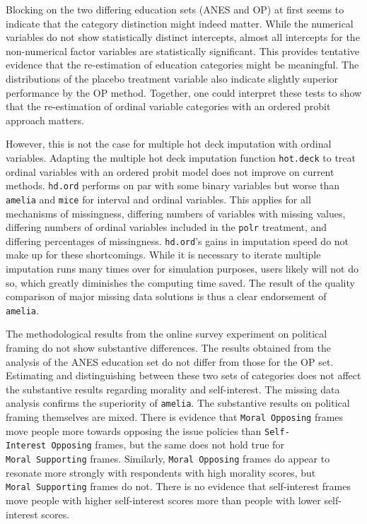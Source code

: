 \documentclass[12pt,econ]{sources/authesis}
\begin{document}
Blocking on the two differing education sets (ANES and OP) at first seems to indicate that the category distinction might indeed matter. While the numerical variables do not show statistically distinct intercepts, almost all intercepts for the non-numerical factor variables are statistically significant. This provides tentative evidence that the re-estimation of education categories might be meaningful. The distributions of the placebo treatment variable also indicate slightly superior performance by the OP method. Together, one could interpret these tests to show that the re-estimation of ordinal variable categories with an ordered probit approach matters.

However, this is not the case for multiple hot deck imputation with ordinal variables. Adapting the multiple hot deck imputation function \texttt{hot.deck} to treat ordinal variables with an ordered probit model does not improve on current methods. \texttt{hd.ord} performs on par with some binary variables but worse than \texttt{amelia} and \texttt{mice} for interval and ordinal variables. This applies for all mechanisms of missingness, differing numbers of variables with missing values, differing numbers of ordinal variables included in the \texttt{polr} treatment, and differing percentages of missingness. \texttt{hd.ord}'s gains in imputation speed do not make up for these shortcomings. While it is necessary to iterate multiple imputation runs many times over for simulation purposes, users likely will not do so, which greatly diminishes the computing time saved. The result of the quality comparison of major missing data solutions is thus a clear endorsement of \texttt{amelia}.

The methodological results from the online survey experiment on political framing do not show substantive differences. The results obtained from the analysis of the ANES education set do not differ from those for the OP set. Estimating and distinguishing between these two sets of categories does not affect the substantive results regarding morality and self-interest. The missing data analysis confirms the superiority of \texttt{amelia}. The substantive results on political framing themselves are mixed. There is evidence that \texttt{Moral\ Opposing} frames move people more towards opposing the issue policies than \texttt{Self-Interest\ Opposing} frames, but the same does not hold true for \texttt{Moral\ Supporting} frames. Similarly, \texttt{Moral\ Opposing} frames do appear to resonate more strongly with respondents with high morality scores, but \texttt{Moral\ Supporting} frames do not. There is no evidence that self-interest frames move people with higher self-interest scores more than people with lower self-interest scores.
\end{document}
